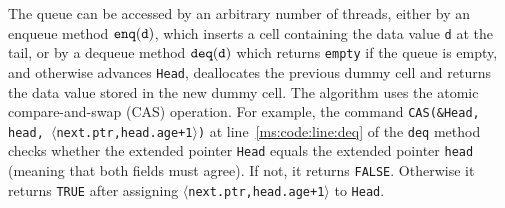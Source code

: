 
The queue can be accessed by an arbitrary number of threads, either by
an enqueue method $\mathtt{enq(d)}$, which inserts a cell containing the data value {\tt d} at the tail, 
or by a dequeue method $\mathtt{deq(d)}$ which returns  {\tt empty}
if the queue is empty, and otherwise advances {\tt Head},
deallocates the previous dummy cell
and returns the data value stored in the new dummy cell. 
The algorithm uses the atomic compare-and-swap (CAS) operation.
For example,
the command {\tt CAS(\&Head, head, $\langle$next.ptr,head.age+1$\rangle$)}
at line~\ref{ms:code:line:deq} of the {\tt deq}
method checks whether the extended pointer {\tt Head} equals the extended pointer {\tt head} (meaning that both fields must agree).
If not, it returns {\tt FALSE}. Otherwise it returns {\tt TRUE} after assigning
{\tt $\langle$next.ptr,head.age+1$\rangle$} to {\tt Head}.




